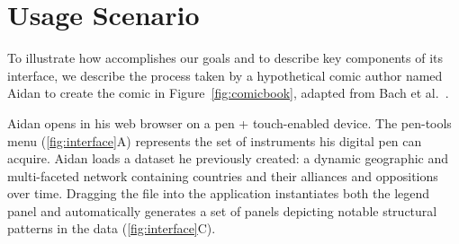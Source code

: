 
\section{Usage Scenario}
\label{sec:scenario}

To illustrate how \toolname{} accomplishes our goals and to describe key components of its interface, we describe the process taken by a hypothetical comic author named Aidan to create the comic in Figure~\ref{fig:comicbook}, adapted from Bach et al.~\cite{bach2016telling}. 





Aidan opens \toolname{} in his web browser on a pen + touch-enabled device. The pen-tools menu (\autoref{fig:interface}A) represents the set of instruments his digital pen can acquire.  Aidan loads a dataset he previously created: a dynamic geographic and multi-faceted network containing countries and their alliances and oppositions over time. Dragging the file into the application instantiates both the legend panel and automatically generates a set of panels depicting notable structural patterns in the data (\autoref{fig:interface}C).  %

